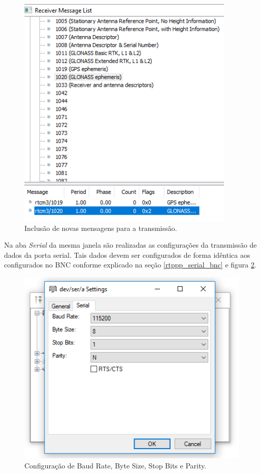 \begin{figure}[H]
\centering
\includegraphics[scale=0.5]{pfc_pdf_files/img/TRU_14_msg.png} %
\caption{Inclusão de novas mensagens para a transmissão.}
\label{new_msg_receptor}
\end{figure}


Na aba \textit{Serial} da mesma janela são realizadas as configurações da transmissão de dados da porta serial. Tais dados devem ser configurados de forma idêntica aos configurados no BNC conforme explicado na seção \ref{rtppp_serial_bnc} e figura \ref{TRU_serial}.

\begin{figure}[H]
\centering
\includegraphics[scale=0.4]{pfc_pdf_files/img/TRU_11_porta_a.png} %
\caption{Configuração de Baud Rate, Byte Size, Stop Bits e Parity.}
\label{TRU_serial}
\end{figure}

